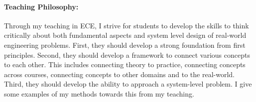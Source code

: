 \documentclass[10pt]{article}
\begin{document}
\paragraph{Teaching Philosophy: }
Through my teaching in ECE, I strive for students to develop the skills to think critically about both fundamental aspects and system level design of real-world engineering problems. First, they should develop a strong foundation from first principles. Second, they should develop a framework to connect various concepts to each other. This includes connecting theory to practice, connecting concepts across courses, connecting concepts to other domains and to the real-world. Third, they should develop the ability to approach a system-level problem. I give some examples of my methods towards this from my teaching.\\ %


\end{document}
